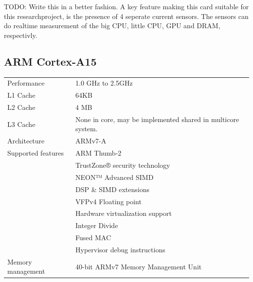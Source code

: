 TODO: Write this in a better fashion.
A key feature making this card suitable for this researchproject, is the presence of 4 seperate current sensors.
The sensors can do realtime measurement of the big CPU, little CPU, GPU and DRAM, respectivly.

\subsection{ARM Cortex-A15}
\begin{table}[H]
  \begin{tabular}{ll}
    Performance       & 1.0 GHz to 2.5GHz  \\
    L1 Cache          & 64KB \\
    L2 Cache          & 4 MB \\
    L3 Cache          & None in core, may be implemented shared in multicore system. \\
    Architecture      & ARMv7-A            \\
    Supported features& ARM Thumb-2 \\
                      & TrustZone® security technology \\
                      & NEON™ Advanced SIMD \\
                      & DSP \& SIMD extensions \\
                      & VFPv4 Floating point \\
                      & Hardware virtualization support \\
                      & Integer Divide \\
                      & Fused MAC \\
                      & Hypervisor debug instructions \\
    Memory management & 40-bit ARMv7 Memory Management Unit
  \end{tabular}
\end{table}
